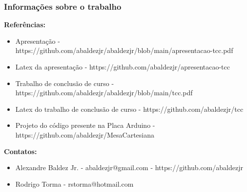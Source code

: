 \begin{frame}
\frametitle{Informações sobre o trabalho}
\tiny

\textbf{Referências:}
\begin{itemize}
    \item Apresentação - https://github.com/abaldezjr/abaldezjr/blob/main/apresentacao-tcc.pdf
    \item Latex da apresentação - https://github.com/abaldezjr/apresentacao-tcc
    \item Trabalho de conclusão de curso - https://github.com/abaldezjr/abaldezjr/blob/main/tcc.pdf
    \item Latex do trabalho de conclusão de curso - https://github.com/abaldezjr/tcc
    \item Projeto do código presente na Placa Arduino - https://github.com/abaldezjr/MesaCartesiana
\end{itemize}

\textbf{Contatos:}
\begin{itemize}
    \item Alexandre Baldez Jr. - abaldezjr@gmail.com - https://github.com/abaldezjr
    \item Rodrigo Torma - rstorma@hotmail.com
\end{itemize}

    
\end{frame}